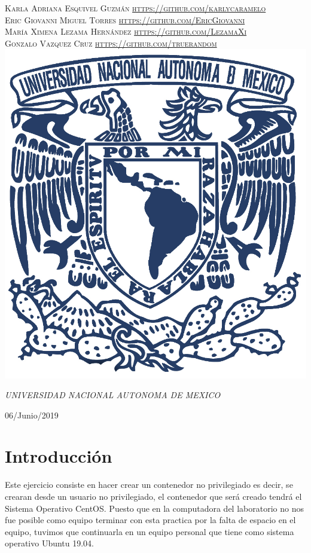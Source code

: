 \documentclass[a4paper, 11pt, oneside]{article}
\begin{document}
\begin{titlepage}
	{\scshape\Large Karla Adriana Esquivel Guzmán \url{https://github.com/karlycaramelo} \\
    Eric Giovanni Miguel Torres \url{https://github.com/EricGiovanni}\\ 
    María Ximena Lezama Hernández \url{https://github.com/LezamaXi}\\ 
    Gonzalo Vazquez Cruz \url{https://github.com/truerandom}}
	\vspace{0.5\baselineskip} 
	\vfill
	\includegraphics[scale=0.65]{unam.jpg}
	
	\textit{UNIVERSIDAD NACIONAL AUTONOMA DE MEXICO} 
	
	
	
	
	
	\vspace{0.3\baselineskip} 
	
	06/Junio/2019
	
	 

\end{titlepage}
\section*{Introducción}
Este ejercicio consiste en hacer crear un contenedor no privilegiado es decir, se crearan desde un usuario no privilegiado, el contenedor que será creado tendrá el Sistema Operativo CentOS. Puesto que en la computadora del laboratorio no nos fue posible como equipo terminar con esta practica por la falta de espacio en el equipo, tuvimos que continuarla en un equipo personal que tiene como sistema operativo Ubuntu 19.04.
\end{document}
